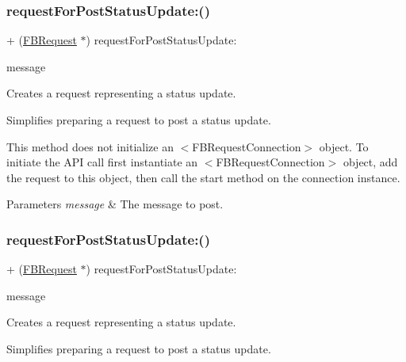 \subsubsection{\texorpdfstring{request\+For\+Post\+Status\+Update\+:()}{requestForPostStatusUpdate:()}\hspace{0.1cm}{\footnotesize\ttfamily [4/5]}}
{\footnotesize\ttfamily + (\hyperlink{interfaceFBRequest}{F\+B\+Request} $\ast$) request\+For\+Post\+Status\+Update\+: \begin{DoxyParamCaption}\item[{(N\+S\+String $\ast$)}]{message }\end{DoxyParamCaption}}

Creates a request representing a status update.

Simplifies preparing a request to post a status update.

This method does not initialize an $<$\+F\+B\+Request\+Connection$>$ object. To initiate the A\+PI call first instantiate an $<$\+F\+B\+Request\+Connection$>$ object, add the request to this object, then call the {\ttfamily start} method on the connection instance.


\begin{DoxyParams}{Parameters}
{\em message} & The message to post. \\
\hline
\end{DoxyParams}
\mbox{\label{interfaceFBRequest_a0a745a53f4764835bd0945bd66fe10fd}} 
\subsubsection{\texorpdfstring{request\+For\+Post\+Status\+Update\+:()}{requestForPostStatusUpdate:()}\hspace{0.1cm}{\footnotesize\ttfamily [5/5]}}
{\footnotesize\ttfamily + (\hyperlink{interfaceFBRequest}{F\+B\+Request} $\ast$) request\+For\+Post\+Status\+Update\+: \begin{DoxyParamCaption}\item[{(N\+S\+String $\ast$)}]{message }\end{DoxyParamCaption}}

Creates a request representing a status update.

Simplifies preparing a request to post a status update.

